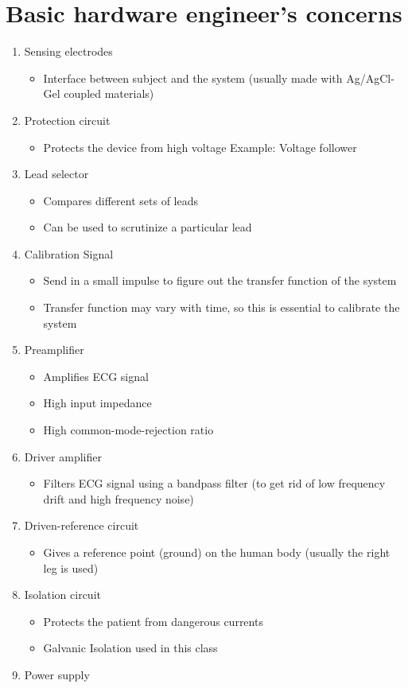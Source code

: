 \documentclass[11pt]{book}
\begin{document}
\section{Basic hardware engineer's concerns}
\begin{enumerate}
	\item Sensing electrodes
	\begin{itemize}
		\item Interface between subject and the system (usually made with Ag/AgCl- Gel coupled materials)
	\end{itemize}
	\item Protection circuit
	\begin{itemize}
		\item Protects the device from high voltage
		Example: Voltage follower
	\end{itemize}
	\item Lead selector
	\begin{itemize}
		\item Compares different sets of leads
		\item Can be used to scrutinize a particular lead
	\end{itemize}
	\item Calibration Signal
	\begin{itemize}
		\item Send in a small impulse to figure out the transfer function of the system
		\item Transfer function may vary with time, so this is essential to calibrate the system
	\end{itemize}
	\item Preamplifier
	\begin{itemize}
		\item Amplifies ECG signal
		\item High input impedance
		\item High common-mode-rejection ratio
	\end{itemize}
	\item Driver amplifier
	\begin{itemize}
		\item Filters ECG signal using a bandpass filter (to get rid of low frequency drift and high frequency noise)
	\end{itemize}
	\item Driven-reference circuit
	\begin{itemize}
		\item Gives a reference point (ground) on the human body (usually the right leg is used)
	\end{itemize}
	\item Isolation circuit
	\begin{itemize}
		\item Protects the patient from dangerous currents
		\item Galvanic Isolation used in this class
	\end{itemize}
	\item Power supply
\end{enumerate}
\end{document}
